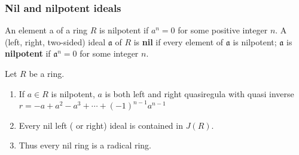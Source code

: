 \subsubsection{Nil and nilpotent ideals} %
\begin{definition}
    An element a of a ring $R$ is nilpotent if $a^n=0$ for some positive integer $n$.
    A (left, right, two-sided) ideal $\mathfrak{a}$ of $R$ is \textbf{nil} if every element of $\mathfrak{a}$ is nilpotent; $\mathfrak{a}$ is \textbf{nilpotent} if $\mathfrak{a}^n=0$ for some integer $n$.
\end{definition}


\begin{theorem}
    \label{thm: nil ideal}
    Let $R$ be a ring.
    \begin{enumerate}
        \item
              If $a\in R$ is nilpotent, $a$ is both left and right quasiregula with quasi inverse $r=-a+a^2-a^3+\cdots+(-1)^{n-1} a^{n-1}$
        \item
              Every nil left ( or right) ideal is contained in $J(R)$.
        \item
              Thus every nil ring is a radical ring.
    \end{enumerate}
\end{theorem}

